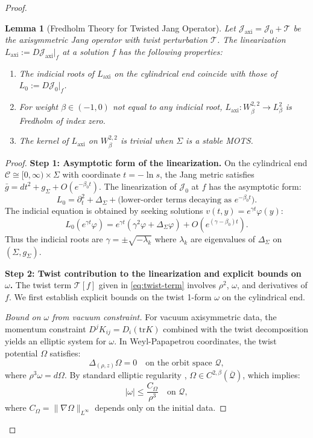 \documentclass[12pt]{article}
\theoremstyle{plain}
\newtheorem{lemma}[theorem]{Lemma}
\theoremstyle{definition}
\theoremstyle{remark}
\newcommand{\tr}{\mathrm{tr}}
\newcommand{\bg}{\bar{g}}
\begin{document}
\begin{proof}
\begin{lemma}[Fredholm Theory for Twisted Jang Operator]\label{lem:twisted-indicial}\label{lem:fredholm}
Let $\mathcal{J}_{\mathrm{axi}} = \mathcal{J}_0 + \mathcal{T}$ be the axisymmetric Jang operator with twist perturbation $\mathcal{T}$. The linearization $L_{\mathrm{axi}} := D\mathcal{J}_{\mathrm{axi}}|_f$ at a solution $f$ has the following properties:
\begin{enumerate}
    \item[(i)] The indicial roots of $L_{\mathrm{axi}}$ on the cylindrical end coincide with those of $L_0 := D\mathcal{J}_0|_f$.
    \item[(ii)] For weight $\beta \in (-1, 0)$ not equal to any indicial root, $L_{\mathrm{axi}}: W^{2,2}_\beta \to L^2_\beta$ is Fredholm of index zero.
    \item[(iii)] The kernel of $L_{\mathrm{axi}}$ on $W^{2,2}_\beta$ is trivial when $\Sigma$ is a stable MOTS.
\end{enumerate}
\end{lemma}

\begin{proof}
\textbf{Step 1: Asymptotic form of the linearization.}
On the cylindrical end $\mathcal{C} \cong [0, \infty) \times \Sigma$ with coordinate $t = -\ln s$, the Jang metric satisfies $\bg = dt^2 + g_\Sigma + O(e^{-\beta_0 t})$. The linearization of $\mathcal{J}_0$ at $f$ has the asymptotic form:
\[
L_0 = \partial_t^2 + \Delta_\Sigma + \text{(lower-order terms decaying as } e^{-\beta_0 t}).
\]
The indicial equation is obtained by seeking solutions $v(t, y) = e^{\gamma t} \varphi(y)$:
\[
L_0(e^{\gamma t}\varphi) = e^{\gamma t}(\gamma^2 \varphi + \Delta_\Sigma \varphi) + O(e^{(\gamma - \beta_0)t}).
\]
Thus the indicial roots are $\gamma = \pm\sqrt{-\lambda_k}$ where $\lambda_k$ are eigenvalues of $\Delta_\Sigma$ on $(\Sigma, g_\Sigma)$.

\textbf{Step 2: Twist contribution to the linearization and explicit bounds on $\omega$.}
The twist term $\mathcal{T}[f]$ given in \eqref{eq:twist-term} involves $\rho^2$, $\omega$, and derivatives of $f$. We first establish explicit bounds on the twist 1-form $\omega$ on the cylindrical end.

\textit{Bound on $\omega$ from vacuum constraint.} For vacuum axisymmetric data, the momentum constraint $D^j K_{ij} = D_i(\tr K)$ combined with the twist decomposition yields an elliptic system for $\omega$. In Weyl-Papapetrou coordinates, the twist potential $\Omega$ satisfies:
\[
\Delta_{(\rho,z)} \Omega = 0 \quad \text{on the orbit space } \mathcal{Q},
\]
where $\rho^3 \omega = d\Omega$. By standard elliptic regularity \cite[Theorem 8.32]{gilbargtrudinger2001}, $\Omega \in C^{2,\beta}(\overline{\mathcal{Q}})$, which implies:
\begin{equation}\label{eq:omega-bound}
|\omega| \leq \frac{C_\Omega}{\rho^3} \quad \text{on } \mathcal{Q},
\end{equation}
where $C_\Omega = \|\nabla\Omega\|_{L^\infty}$ depends only on the initial data.


\end{proof}
\end{proof}
\end{document}

